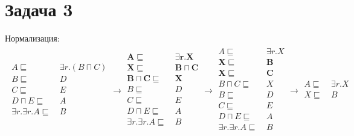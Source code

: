 \documentclass[11pt]{article}
\theoremstyle{definition}
\theoremstyle{lemma}
\theoremstyle{statement}
\begin{document}
\section*{Задача 3}
    Нормализация:
    \begin{multline*}
        \begin{aligned}
            A \sqsubseteq&~\exists r.(B \sqcap C) \\
            B \sqsubseteq&~D \\
            C \sqsubseteq&~E \\
            D \sqcap E \sqsubseteq&~A \\
            \exists r.\exists r.A \sqsubseteq&~B \\
        \end{aligned}
        \rightarrow
        \begin{aligned}
            \mathbf{A} \sqsubseteq&~\mathbf{\exists r.X} \\
            \mathbf{X} \sqsubseteq&~\mathbf{B \sqcap C} \\
            \mathbf{B \sqcap C} \sqsubseteq&~\mathbf{X} \\
            B \sqsubseteq&~D \\
            C \sqsubseteq&~E \\
            D \sqcap E \sqsubseteq&~A \\
            \exists r.\exists r.A \sqsubseteq&~B \\
        \end{aligned}
        \rightarrow
        \begin{aligned}
            A \sqsubseteq&~\exists r.X \\
            \mathbf{X} \sqsubseteq&~\mathbf{B} \\
            \mathbf{X} \sqsubseteq&~\mathbf{C} \\
            B \sqcap C \sqsubseteq&~X \\
            B \sqsubseteq&~D \\
            C \sqsubseteq&~E \\
            D \sqcap E \sqsubseteq&~A \\
            \exists r.\exists r.A \sqsubseteq&~B \\
        \end{aligned}
        \rightarrow
        \begin{aligned}
            A \sqsubseteq&~\exists r.X \\
            X \sqsubseteq&~B \\

\end{aligned}
\end{multline*}
\end{document}
